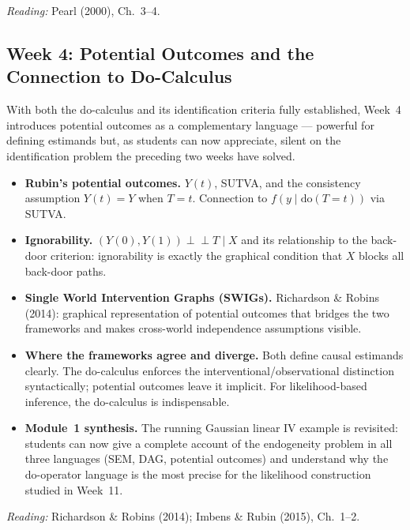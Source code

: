 \documentclass[12pt]{article}
\begin{document}
\noindent\textit{Reading:} Pearl (2000), Ch.~3--4.

\subsection{Week 4: Potential Outcomes and the Connection to Do-Calculus}

With both the do-calculus and its identification criteria fully established,
Week~4 introduces potential outcomes as a complementary language --- powerful
for defining estimands but, as students can now appreciate, silent on the
identification problem the preceding two weeks have solved.

\begin{itemize}
  \item \textbf{Rubin's potential outcomes.}
    $Y(t)$, SUTVA, and the consistency assumption $Y(t) = Y$ when $T = t$.
    Connection to $f(y \mid \mathrm{do}(T{=}t))$ via SUTVA.

  \item \textbf{Ignorability.}
    $(Y(0), Y(1)) \perp\!\!\!\perp T \mid X$ and its relationship to the
    back-door criterion: ignorability is exactly the graphical condition
    that $X$ blocks all back-door paths.

  \item \textbf{Single World Intervention Graphs (SWIGs).}
    Richardson \& Robins (2014): graphical representation of potential
    outcomes that bridges the two frameworks and makes
    cross-world independence assumptions visible.

  \item \textbf{Where the frameworks agree and diverge.}
    Both define causal estimands clearly. The do-calculus enforces the
    interventional/observational distinction syntactically; potential
    outcomes leave it implicit. For likelihood-based inference, the
    do-calculus is indispensable.

  \item \textbf{Module~1 synthesis.}
    The running Gaussian linear IV example is revisited: students can
    now give a complete account of the endogeneity problem in all three
    languages (SEM, DAG, potential outcomes) and understand why the
    do-operator language is the most precise for the likelihood
    construction studied in Week~11.
\end{itemize}

\noindent\textit{Reading:} Richardson \& Robins (2014);
Imbens \& Rubin (2015), Ch.~1--2.
\end{document}
